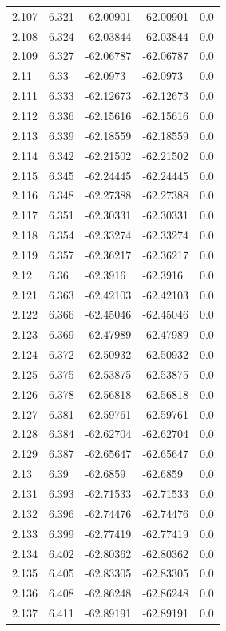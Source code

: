\begin{tabular}{lllll}
2.107 & 6.321 & -62.00901 & -62.00901 & 0.0 \\
2.108 & 6.324 & -62.03844 & -62.03844 & 0.0 \\
2.109 & 6.327 & -62.06787 & -62.06787 & 0.0 \\
2.11 & 6.33 & -62.0973 & -62.0973 & 0.0 \\
2.111 & 6.333 & -62.12673 & -62.12673 & 0.0 \\
2.112 & 6.336 & -62.15616 & -62.15616 & 0.0 \\
2.113 & 6.339 & -62.18559 & -62.18559 & 0.0 \\
2.114 & 6.342 & -62.21502 & -62.21502 & 0.0 \\
2.115 & 6.345 & -62.24445 & -62.24445 & 0.0 \\
2.116 & 6.348 & -62.27388 & -62.27388 & 0.0 \\
2.117 & 6.351 & -62.30331 & -62.30331 & 0.0 \\
2.118 & 6.354 & -62.33274 & -62.33274 & 0.0 \\
2.119 & 6.357 & -62.36217 & -62.36217 & 0.0 \\
2.12 & 6.36 & -62.3916 & -62.3916 & 0.0 \\
2.121 & 6.363 & -62.42103 & -62.42103 & 0.0 \\
2.122 & 6.366 & -62.45046 & -62.45046 & 0.0 \\
2.123 & 6.369 & -62.47989 & -62.47989 & 0.0 \\
2.124 & 6.372 & -62.50932 & -62.50932 & 0.0 \\
2.125 & 6.375 & -62.53875 & -62.53875 & 0.0 \\
2.126 & 6.378 & -62.56818 & -62.56818 & 0.0 \\
2.127 & 6.381 & -62.59761 & -62.59761 & 0.0 \\
2.128 & 6.384 & -62.62704 & -62.62704 & 0.0 \\
2.129 & 6.387 & -62.65647 & -62.65647 & 0.0 \\
2.13 & 6.39 & -62.6859 & -62.6859 & 0.0 \\
2.131 & 6.393 & -62.71533 & -62.71533 & 0.0 \\
2.132 & 6.396 & -62.74476 & -62.74476 & 0.0 \\
2.133 & 6.399 & -62.77419 & -62.77419 & 0.0 \\
2.134 & 6.402 & -62.80362 & -62.80362 & 0.0 \\
2.135 & 6.405 & -62.83305 & -62.83305 & 0.0 \\
2.136 & 6.408 & -62.86248 & -62.86248 & 0.0 \\
2.137 & 6.411 & -62.89191 & -62.89191 & 0.0 \\

\end{tabular}
